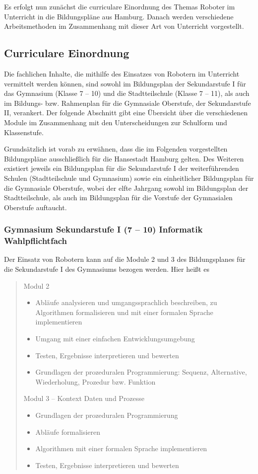 \documentclass[paper=a4, DIV=calc, BCOR=15mm, twoside=on, onecolumn=on, open = right, titlepage =on, parskip =half, headsepline = on, footsepline = on, chapterprefix = off, appendixprefix = off, fontsize = 12pt, numbers = noenddot, abstract = on]{scrbook}
\begin{document}
Es erfolgt nun zunächst die curriculare Einordnung des Themas Roboter im Unterricht in die Bildungspläne aus Hamburg. Danach werden verschiedene Arbeitsmethoden im Zusammenhang mit dieser Art von Unterricht vorgestellt.

\subsection{Curriculare Einordnung}
Die fachlichen Inhalte, die mithilfe des Einsatzes von Robotern im Unterricht vermittelt werden können, sind sowohl im Bildungsplan der Sekundarstufe I für das Gymnasium (Klasse 7 -- 10) und die Stadtteilschule (Klasse 7 -- 11), als auch im Bildungs- bzw. Rahmenplan für die Gymnasiale Oberstufe, der Sekundarstufe II, verankert. Der folgende Abschnitt gibt eine Übersicht über die verschiedenen Module im Zusammenhang mit den Unterscheidungen zur Schulform und Klassenstufe.

Grundsätzlich ist vorab zu erwähnen, dass die im Folgenden vorgestellten Bildungspläne ausschließlich für die Hansestadt Hamburg gelten. Des Weiteren existiert jeweils ein Bildungsplan für die Sekundarstufe I der weiterführenden Schulen (Stadtteilschule und Gymnasium) sowie ein einheitlicher Bildungsplan für die Gymnasiale Oberstufe, wobei der elfte Jahrgang sowohl im Bildungsplan der Stadtteilschule, als auch im Bildungsplan für die Vorstufe der Gymnasialen Oberstufe auftaucht. 

\subsubsection{Gymnasium Sekundarstufe I (7 -- 10) Informatik Wahlpflichtfach}
Der Einsatz von Robotern kann auf die Module 2 und 3 des Bildungsplanes für die Sekundarstufe I des Gymnasiums bezogen werden. Hier heißt es\\

 \begin{quote}
Modul 2
\begin{itemize}
\item Abläufe analysieren und umgangssprachlich beschreiben, zu Algorithmen formalisieren und mit einer formalen Sprache implementieren
\item Umgang mit einer einfachen Entwicklungsumgebung
\item Testen, Ergebnisse interpretieren und bewerten
\item Grundlagen der prozeduralen Programmierung: Sequenz, Alternative, Wiederholung, Prozedur bzw. Funktion
\end{itemize}

Modul 3 -- Kontext Daten und Prozesse
\begin{itemize}
\item Grundlagen der prozeduralen Programmierung
\item Abläufe formalisieren
\item Algorithmen mit einer formalen Sprache implementieren
\item Testen, Ergebnisse interpretieren und bewerten \qquad \cite{gymsek1:11} 
\end{itemize}
 \end{quote}
\end{document}

